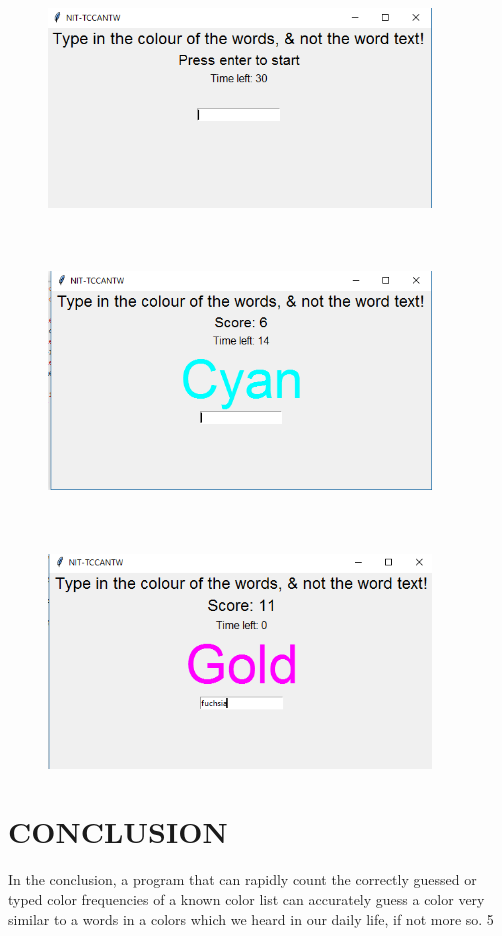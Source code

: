 \documentclass[12pt]{article}
\begin{document}
\begin{figure} [H]
		\includegraphics [width=4in]{1-MainPage.png} \\\\\\\\
		\includegraphics [width=4in]{2.png}		\\\\\\\\
		\includegraphics[width=4in]{3.png}
\end{figure}

\pagebreak

\section{CONCLUSION}
In the conclusion, a program that can rapidly count the correctly guessed or typed color frequencies of a known color list can accurately guess a color very similar to a words in a colors which we heard in our daily life, if not more so. 5
\end{document}
